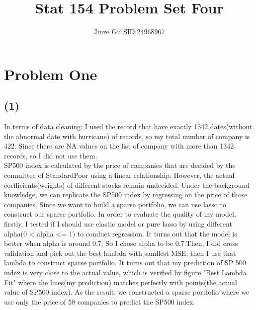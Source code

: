 \documentclass{article}\usepackage[]{graphicx}\usepackage[]{color}
\begin{document}
\title{Stat 154 Problem Set Four}


\author{Jinze Gu SID:24968967}


\maketitle
\section*{Problem One}
\subsection*{(1)}
In terms of data cleaning: I used the record that have exactly 1342 dates(without the abnormal date with hurricane) of records, so my total number of company is 422. Since there are NA values on the list of company with more than 1342 records, so I did not use them.\\
SP500 index is calculated by the price of companies that are decided by the committee of StandardPoor using a linear relationship. However, the actual coefficients(weights) of different stocks remain undecided. Under the background knowledge, we can replicate the SP500 index by regressing on the price of those companies. Since we want to build a sparse portfolio, we can use lasso to construct our sparse portfolio. In order to evaluate the quality of my model, firstly, I tested if I should use elastic model or pure lasso by using different alpha(0 < alpha <= 1) to conduct regression. It turns out that the model is better when alpha is around 0.7. So I chose alpha to be 0.7.Then, I did cross validation and pick out the best lambda with samllest MSE; then I use that lambda to construct sparse portfolio. It turns out that my prediction of SP 500 index is very close to the actual value, which is verified by figure "Best Lambda Fit" where the lines(my prediction) matches perfectly with points(the actual value of SP500 index). As the result, we constructed a sparse portfolio where we use only the price of 58 companies to predict the SP500 index.
\end{document}
